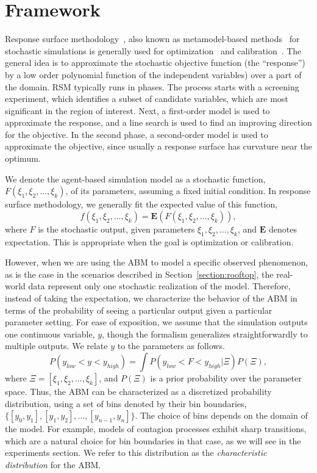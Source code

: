 \section{Framework}

Response surface methodology~\cite{box51response,carley04response}, also known as metamodel-based methods~\cite{barton06metamodel} for stochastic simulations is generally used for optimization~\cite{neddermeijer00response} and calibration~\cite{fadikar17emulation, lamperti18calibration}.
The general idea is to approximate the stochastic objective function (the ``response'') by a low order polynomial function
of the independent variables) over a part of the domain.
RSM typically runs in phases. The process starts with a screening experiment, which identifies a subset of
candidate variables, which are most significant in the region of interest.
Next, a first-order model is used to approximate the response, and a line search is used to 
find an improving direction for the objective.
In the second phase, a second-order model is used to approximate the objective, since
usually a response surface has curvature near the optimum.


We denote the agent-based simulation model as a stochastic function, $F(\xi_1, \xi_2, ..., \xi_k)$, of its parameters, assuming a fixed initial condition. In response surface methodology, we generally fit the expected value of this function,
\begin{equation}
f(\xi_1, \xi_2, ..., \xi_k) = \mathbf{E}(F(\xi_1, \xi_2, ..., \xi_k)),
\end{equation}
where $F$ is the stochastic output, given parameters $\xi_1, \xi_2, ..., \xi_k$, and $\mathbf{E}$ denotes expectation. This is appropriate when the goal is optimization or calibration.

However, when we are using the ABM to model a specific observed phenomenon, as is the case in the scenarios described in Section~\ref{section:rooftop}, the real-world data represent only one stochastic realization of the model.
Therefore, instead of taking the expectation, we characterize the behavior of the ABM in terms of the probability of seeing a particular output given a particular
parameter setting. For ease of exposition, we assume that the simulation outputs one continuous variable, $y$, though the
formalism generalizes straightforwardly to multiple outputs. We relate $y$ to the parameters as follows.
\begin{equation}
P(y_{low} < y < y_{high}) = \int P(y_{low} < F < y_{high}|\Xi)P(\Xi),
\label{eqn:output_probability}
\end{equation}
where $\Xi = [\xi_1, \xi_2, ..., \xi_k]$, and $P(\Xi)$ is a prior probability over the parameter space. Thus, the ABM can be
characterized as a discretized probability distribution, using a set of bins denoted by their bin boundaries, $\{[y_0,y_1], [y_1,y_2], ..., [y_{n-1}, y_n]\}$.
The choice of bins depends on the domain of the model. For example, models of contagion processes exhibit sharp
transitions, which are a natural choice for bin boundaries in that case, as we will see in the experiments section. We
refer to this distribution as the \emph{characteristic distribution} for the ABM.

